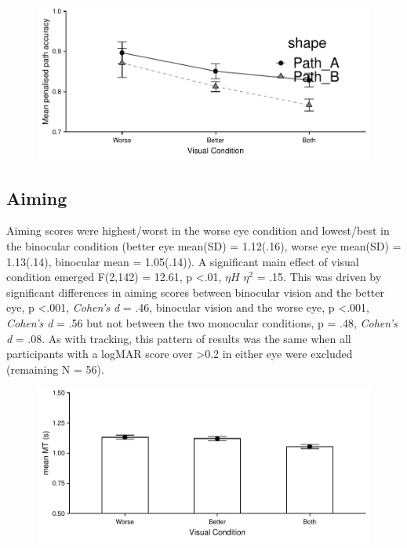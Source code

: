 \documentclass[
  english,
  man,floatsintext]{apa6}
\begin{document}
\begin{figure}

{\centering \includegraphics{cataracts_paper_giveup_files/figure-latex/unnamed-chunk-1-1} 

}

\caption{ }\label{fig:unnamed-chunk-1}
\end{figure}

\hypertarget{aiming}{%
\subsection{Aiming}\label{aiming}}

Aiming scores were highest/worst in the worse eye condition and lowest/best in the binocular condition (better eye mean(SD) = 1.12(.16), worse eye mean(SD) = 1.13(.14), binocular mean = 1.05(.14)).
A significant main effect of visual condition emerged F(2,142) = 12.61, p \textless{}.01, \(\eta H\) \(\eta^2\) = .15.
This was driven by significant differences in aiming scores between binocular vision and the better eye, p \textless{}.001, \emph{Cohen's d} = .46, binocular vision and the worse eye, p \textless{}.001, \emph{Cohen's d} = .56 but not between the two monocular conditions, p = .48, \emph{Cohen's d} = .08.
As with tracking, this pattern of results was the same when all participants with a logMAR score over \textgreater{}0.2 in either eye were excluded (remaining N = 56).

\begin{figure}

{\centering \includegraphics{cataracts_paper_giveup_files/figure-latex/unnamed-chunk-2-1} 

}

\caption{ }\label{fig:unnamed-chunk-2}
\end{figure}
\end{document}
